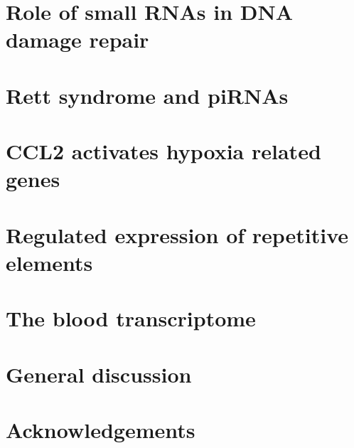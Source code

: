 \documentclass[10pt,a4paper]{report}
\begin{document}
\chapter{Role of small RNAs in DNA damage repair}\label{ddrna}



\chapter{Rett syndrome and piRNAs}\label{pirna}



\chapter{CCL2 activates hypoxia related genes}\label{ccl2}



\chapter{Regulated expression of repetitive elements}\label{repeat}


\chapter{The blood transcriptome}\label{blood}


%

\chapter{General discussion}


\chapter*{Acknowledgements}




\end{document}
